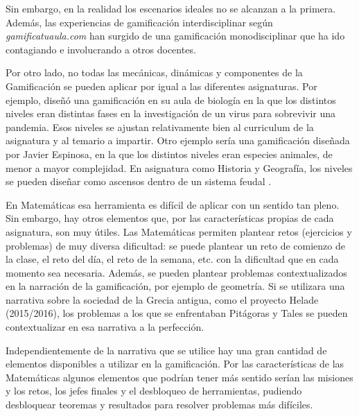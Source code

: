 Sin embargo, en la realidad los escenarios ideales no se alcanzan a la primera.
%
Además, las experiencias de gamificación interdisciplinar según \textit{gamificatuaula.com} han surgido de una gamificación monodisciplinar que ha ido contagiando e involucrando a otros docentes.


Por otro lado, no todas las mecánicas, dinámicas y componentes de la Gamificación se pueden aplicar por igual a las diferentes asignaturas.
%
Por ejemplo, \cite{ClassAVideogame} diseñó una gamificación en su aula de biología en la que los distintos niveles eran distintas fases en la investigación de un virus para sobrevivir una pandemia.
%
Esos niveles se ajustan relativamente bien al curriculum de la asignatura y al temario a impartir.
%
Otro ejemplo sería una gamificación diseñada por Javier Espinosa, en la que los distintos niveles eran especies animales, de menor a mayor complejidad.
%
En asignatura como Historia y Geografía, los niveles se pueden diseñar como ascensos dentro de un sistema feudal \citep{Feudal}.

En Matemáticas esa herramienta es difícil de aplicar con un sentido tan pleno.
%
Sin embargo, hay otros elementos que, por las características propias de cada asignatura, son muy útiles.
%
Las Matemáticas permiten plantear retos (ejercicios y problemas) de muy diversa dificultad: se puede plantear un reto de comienzo de la clase, el reto del día, el reto de la semana, etc. con la dificultad que en cada momento sea necesaria.
%
Además, se pueden plantear problemas contextualizados en la narración de la gamificación, por ejemplo de geometría.
%
Si se utilizara una narrativa sobre la sociedad de la Grecia antigua, como el proyecto Helade (2015/2016), los problemas a los que se enfrentaban Pitágoras y Tales se pueden contextualizar en esa narrativa a la perfección.


Independientemente de la narrativa que se utilice hay una gran cantidad de elementos disponibles a utilizar en la gamificación. 
%
Por las características de las Matemáticas algunos elementos que podrían tener más sentido serían las misiones y los retos, los jefes finales y el desbloqueo de herramientas, pudiendo desbloquear teoremas y resultados para resolver problemas más difíciles.
